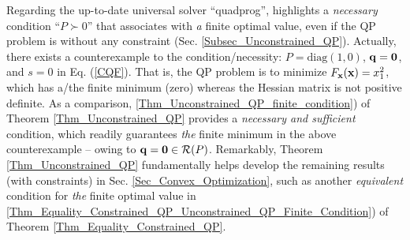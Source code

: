 \documentclass{imaman}
\newcommand{\bfx}{{\bf x}}
\newcommand{\bfq}{{\bf q}}
\newcommand{\bfzero}{{\bf 0}}
\newcommand{\calR}{{\mathcal R}}
\numberwithin{equation}{section}
\begin{document}
\begin{example}
\vspace{-0.4cm}\begin{remark}
Regarding the up-to-date universal solver ``quadprog'', \cite{MATLAB} highlights a \textit{necessary} condition ``$P\succ 0$'' that associates with \textit{a} finite optimal value, even if the QP problem is without any constraint (Sec. \ref{Subsec_Unconstrained_QP}). Actually, there exists a counterexample to the condition/necessity: $P=\mbox{diag}(1,0)$, $\bfq=\bfzero$, and $s=0$ in Eq. (\ref{CQF}). That is, the QP problem is to minimize $F_\bfx(\bfx)=x_1^2$, which has a/the finite minimum (zero) whereas the Hessian matrix is not positive definite. As a comparison, \ref{Thm_Unconstrained_QP_finite_condition}) of Theorem \ref{Thm_Unconstrained_QP} provides a \textit{necessary and sufficient} condition, which readily guarantees \textit{the} finite minimum in the above counterexample -- owing to $\bfq=\bfzero\in\calR(P)$. Remarkably, Theorem \ref{Thm_Unconstrained_QP} fundamentally helps develop the remaining results (with constraints) in Sec. \ref{Sec_Convex_Optimization}, such as another \textit{equivalent} condition for \textit{the} finite optimal value in \ref{Thm_Equality_Constrained_QP_Unconstrained_QP_Finite_Condition}) of Theorem \ref{Thm_Equality_Constrained_QP}.
\end{remark}

\label{Ex_MATLAB}
\end{example}

\vspace{-0.5cm}
\end{document}
